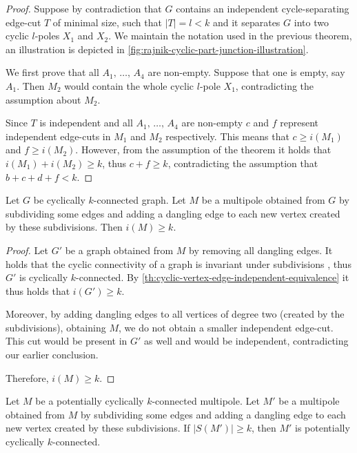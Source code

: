 \documentclass[12pt, twoside]{book}
\begin{document}
\begin{proof}
	Suppose by contradiction that $G$ contains an independent cycle-separating edge-cut $T$ of minimal size, such that $|T|=l<k$ and it separates $G$ into two cyclic $l$-poles $X_1$ and $X_2$. We maintain the notation used in the previous theorem, an illustration is depicted in \cref{fig:rajnik-cyclic-part-junction-illustration}.
	
	We first prove that all $A_1,\,\dots,\,A_4$ are non-empty. Suppose that one is empty, say $A_1$. Then $M_2$ would contain the whole cyclic $l$-pole $X_1$, contradicting the assumption about $M_2$.
	
	Since $T$ is independent and all $A_1,\,\dots,\,A_4$ are non-empty $c$ and $f$ represent independent edge-cuts in $M_1$ and $M_2$ respectively. This means that ${c\geq i(M_1)}$ and ${f\geq i(M_2)}$. However, from the assumption of the theorem it holds that ${i(M_1)+i(M_2)\geq k}$, thus ${c+f\geq k}$, contradicting the assumption that ${b+c+d+f<k}$.
\end{proof}

\begin{lemma}\label{lem:subdivisions-smallest-independent-cut}
	Let $G$ be cyclically $k$-connected graph. Let $M$ be a multipole obtained from $G$ by subdividing some edges and adding a dangling edge to each new vertex created by these subdivisions. Then $i(M)\geq k$.
\end{lemma}

\begin{proof}
	Let $G'$ be a graph obtained from $M$ by removing all dangling edges. It holds that the cyclic connectivity of a graph is invariant under subdivisions \cite{atoms-of-cyclic}, thus $G'$ is cyclically $k$-connected. By \cref{th:cyclic-vertex-edge-independent-equivalence} it thus holds that $i(G')\geq k$.
	
	Moreover, by adding dangling edges to all vertices of degree two (created by the subdivisions), obtaining $M$, we do not obtain a smaller independent edge-cut. This cut would be present in $G'$ as well and would be independent, contradicting our earlier conclusion.
	
	Therefore, $i(M)\geq k$.
\end{proof}

\begin{theorem}\label{th:subdivisions-potentially-cyclically-connected}
	Let $M$ be a potentially cyclically $k$-connected multipole. Let $M'$ be a multipole obtained from $M$ by subdividing some edges and adding a dangling edge to each new vertex created by these subdivisions. If $|S(M')|\geq k$, then $M'$ is potentially cyclically $k$-connected.
\end{theorem}
\end{document}
